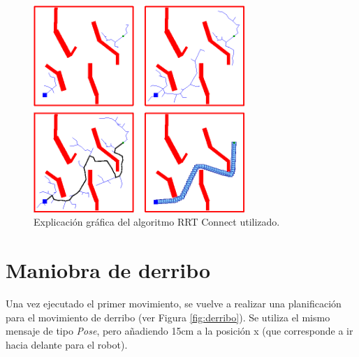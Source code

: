 \documentclass[12pt,spanish,chapterprefix, numbers=noenddot]{book}
\numberwithin{equation}{section}
\numberwithin{figure}{section}
\begin{document}
\begin{figure}[hbt!]
\centering
\includegraphics[width=8cm]{Figs/rrtConnect.png}
\par
\caption{\label{fig:rrtConnect}Explicación gráfica del algoritmo RRT Connect utilizado.}
\end{figure}

\section{Maniobra de derribo}
Una vez ejecutado el primer movimiento, se vuelve a realizar una planificación para el movimiento de derribo (ver Figura \ref{fig:derribo}). Se utiliza el mismo mensaje de tipo \textit{Pose}, pero añadiendo 15cm a la posición x (que corresponde a ir hacia delante para el robot). 
\end{document}
